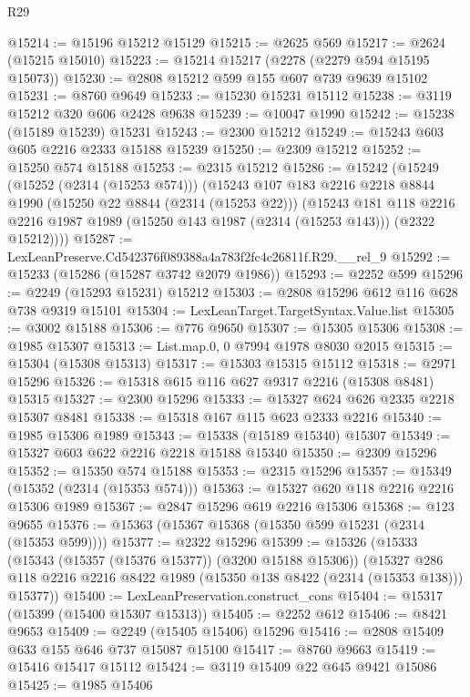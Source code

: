 \begin{lexlean}{R29}
\begin{coremodule}
@15214 := @15196 @15212 @15129
@15215 := @2625 @569
@15217 := @2624 (@15215 @15010)
@15223 := @15214 @15217 (@2278 (@2279 @594 @15195 @15073))
@15230 := @2808 @15212 @599 @155 @607 @739 @9639 @15102
@15231 := @8760 @9649
@15233 := @15230 @15231 @15112
@15238 := @3119 @15212 @320 @606 @2428 @9638
@15239 := @10047 @1990
@15242 := @15238 (@15189 @15239) @15231
@15243 := @2300 @15212
@15249 := @15243 @603 @605 @2216 @2333 @15188 @15239
@15250 := @2309 @15212
@15252 := @15250 @574 @15188
@15253 := @2315 @15212
@15286 := @15242
    (@15249
      (@15252 (@2314 (@15253 @574)))
      (@15243
        @107
        @183
        @2216
        @2218
        @8844
        @1990
        (@15250 @22 @8844 (@2314 (@15253 @22)))
        (@15243
          @181
          @118
          @2216
          @2216
          @1987
          @1989
          (@15250 @143 @1987 (@2314 (@15253 @143)))
          (@2322 @15212))))
@15287 := LexLeanPreserve.Cd542376f089388a4a783f2fc4c26811f.R29.__rel_9
@15292 := @15233 (@15286 (@15287 @3742 @2079 @1986))
@15293 := @2252 @599
@15296 := @2249 (@15293 @15231) @15212
@15303 := @2808 @15296 @612 @116 @628 @738 @9319 @15101
@15304 := LexLeanTarget.TargetSyntax.Value.list
@15305 := @3002 @15188
@15306 := @776 @9650
@15307 := @15305 @15306
@15308 := @1985 @15307
@15313 := List.map.{0, 0} @7994 @1978 @8030 @2015
@15315 := @15304 (@15308 @15313)
@15317 := @15303 @15315 @15112
@15318 := @2971 @15296
@15326 := @15318 @615 @116 @627 @9317 @2216 (@15308 @8481) @15315
@15327 := @2300 @15296
@15333 := @15327 @624 @626 @2335 @2218 @15307 @8481
@15338 := @15318 @167 @115 @623 @2333 @2216
@15340 := @1985 @15306 @1989
@15343 := @15338 (@15189 @15340) @15307
@15349 := @15327 @603 @622 @2216 @2218 @15188 @15340
@15350 := @2309 @15296
@15352 := @15350 @574 @15188
@15353 := @2315 @15296
@15357 := @15349 (@15352 (@2314 (@15353 @574)))
@15363 := @15327 @620 @118 @2216 @2216 @15306 @1989
@15367 := @2847 @15296 @619 @2216 @15306
@15368 := @123 @9655
@15376 := @15363 (@15367 @15368 (@15350 @599 @15231 (@2314 (@15353 @599))))
@15377 := @2322 @15296
@15399 := @15326
    (@15333
      (@15343 (@15357 (@15376 @15377)) (@3200 @15188 @15306))
      (@15327 @286 @118 @2216 @2216 @8422 @1989 (@15350 @138 @8422 (@2314 (@15353 @138))) @15377))
@15400 := LexLeanPreservation.construct_cons
@15404 := @15317 (@15399 (@15400 @15307 @15313))
@15405 := @2252 @612
@15406 := @8421 @9653
@15409 := @2249 (@15405 @15406) @15296
@15416 := @2808 @15409 @633 @155 @646 @737 @15087 @15100
@15417 := @8760 @9663
@15419 := @15416 @15417 @15112
@15424 := @3119 @15409 @22 @645 @9421 @15086
@15425 := @1985 @15406

\end{coremodule}
\end{lexlean}

